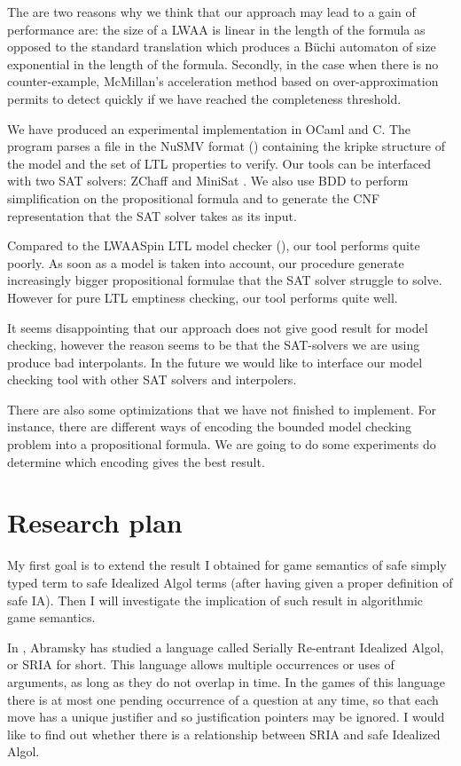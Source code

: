 The are two reasons why we think that our approach may lead to a
gain of performance are: the size of a LWAA is linear in the length
of the formula as opposed to the standard translation which produces
a B\"uchi automaton of size exponential in the length of the
formula. Secondly, in the case when there is no counter-example,
McMillan's acceleration method based on over-approximation permits
to detect quickly if we have reached the completeness threshold.


We have produced an experimental implementation in OCaml and C. The
program parses a file in the NuSMV format (\cite{CAV02:nusmv})
containing the kripke structure of the model and the set of LTL
properties to verify. Our tools can be interfaced with two SAT
solvers: ZChaff \citep{zChaff} and MiniSat \citep{ES03}. We also use
BDD to perform simplification on the propositional formula and to
generate the CNF representation that the SAT solver takes as its
input.

Compared to the LWAASpin LTL model checker (\cite{hammer:truly}),
our tool performs quite poorly. As soon as a model is taken into
account, our procedure generate increasingly bigger propositional
formulae that the SAT solver struggle to solve. However for pure LTL
emptiness checking, our tool performs quite well.

It seems disappointing that our approach does not give good result
for model checking, however the reason seems to be that the
SAT-solvers we are using produce bad interpolants. In the future we
would like to interface our model checking tool with other SAT
solvers and interpolers.

There are also some optimizations that we have not finished to
implement. For instance, there are different ways of encoding the
bounded model checking problem into a propositional formula. We are
going to do some experiments do determine which encoding gives the
best result.

\chapter{Research plan}

My first goal is to extend the result I obtained for game semantics
of safe simply typed term to safe Idealized Algol terms (after
having given a proper definition of safe IA). Then I will
investigate the implication of such result in algorithmic game
semantics.

In \cite{abramsky:mchecking_ia}, Abramsky has studied a language
called Serially Re-entrant Idealized Algol, or SRIA for short. This
language allows multiple occurrences or uses of arguments, as long
as they do not overlap in time. In the games of this language there
is at most one pending occurrence of a question at any time, so that
each move has a unique justifier and so justification pointers may
be ignored. I would like to find out whether there is a relationship
between SRIA and safe Idealized Algol.

